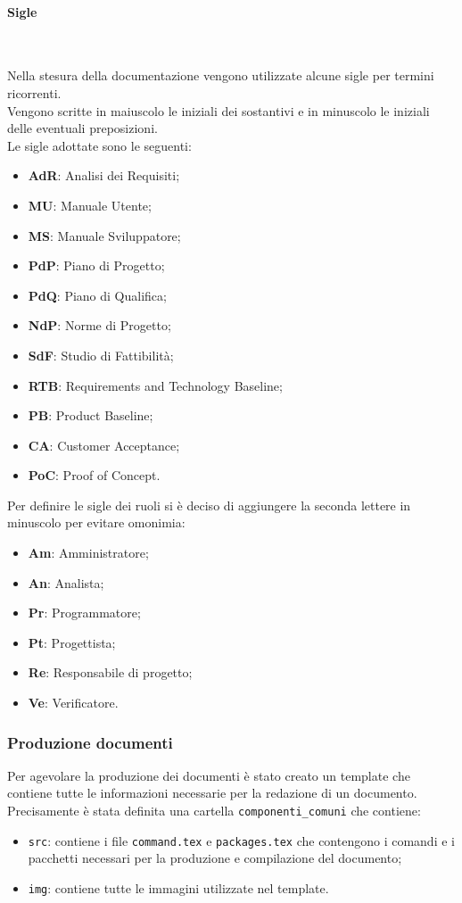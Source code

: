 \paragraph{Sigle} ~

Nella stesura della documentazione vengono utilizzate alcune sigle per termini ricorrenti. \\
Vengono scritte in maiuscolo le iniziali dei sostantivi e in minuscolo le iniziali delle eventuali preposizioni. \\
Le sigle adottate sono le seguenti:
\begin{itemize}
    \item \textbf{AdR}: Analisi dei Requisiti;
    \item \textbf{MU}: Manuale Utente;
    \item \textbf{MS}: Manuale Sviluppatore;
    \item \textbf{PdP}: Piano di Progetto;
    \item \textbf{PdQ}: Piano di Qualifica;
    \item \textbf{NdP}: Norme di Progetto;
    \item \textbf{SdF}: Studio di Fattibilità;
    \item \textbf{RTB}: Requirements and Technology Baseline;
    \item \textbf{PB}: Product Baseline;
    \item \textbf{CA}: Customer Acceptance;
    \item \textbf{PoC}: Proof of Concept.
\end{itemize}

Per definire le sigle dei ruoli si è deciso di aggiungere la seconda lettere in minuscolo per evitare omonimia:
\begin{itemize}
    \item \textbf{Am}: Amministratore;
    \item \textbf{An}: Analista;
    \item \textbf{Pr}: Programmatore;
    \item \textbf{Pt}: Progettista;
    \item \textbf{Re}: Responsabile di progetto;
    \item \textbf{Ve}: Verificatore.
\end{itemize}

\subsubsection{Produzione documenti}
Per agevolare la produzione dei documenti è stato creato un template che contiene tutte le informazioni necessarie per la redazione di un documento.\\
Precisamente è stata definita una cartella \texttt{componenti\_comuni} che contiene:
\begin{itemize}
    \item \texttt{src}: contiene i file \texttt{command.tex} e \texttt{packages.tex} che contengono i comandi e i pacchetti necessari per la produzione e compilazione del documento;
    \item \texttt{img}: contiene tutte le immagini utilizzate nel template.
\end{itemize}

